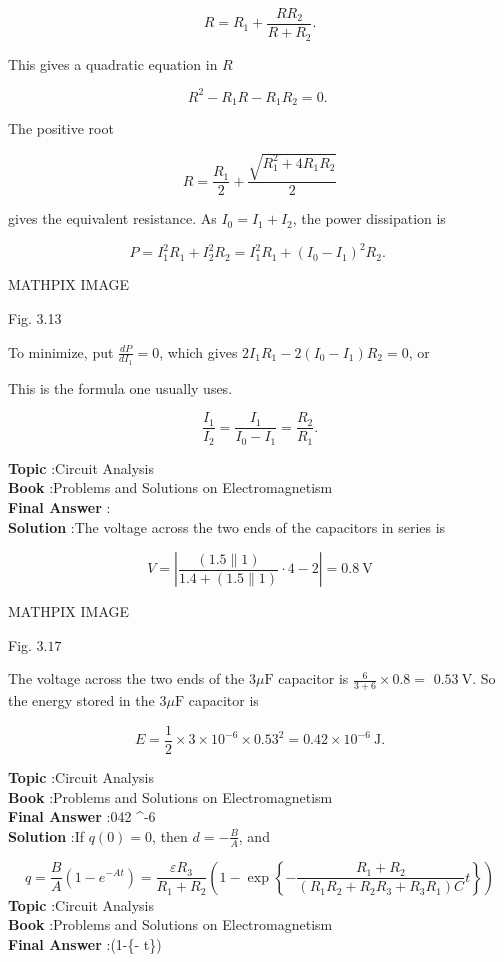 \documentclass[10pt]{article}
\begin{document}
$$
R=R_{1}+\frac{R R_{2}}{R+R_{2}} .
$$

This gives a quadratic equation in $R$

$$
R^{2}-R_{1} R-R_{1} R_{2}=0 \text {. }
$$

The positive root

$$
R=\frac{R_{1}}{2}+\frac{\sqrt{R_{1}^{2}+4 R_{1} R_{2}}}{2}
$$

gives the equivalent resistance.
 As $I_{0}=I_{1}+I_{2}$, the power dissipation is

$$
P=I_{1}^{2} R_{1}+I_{2}^{2} R_{2}=I_{1}^{2} R_{1}+\left(I_{0}-I_{1}\right)^{2} R_{2} \text {. }
$$

MATHPIX IMAGE

Fig. 3.13

To minimize, put $\frac{d P}{d I_{1}}=0$, which gives $2 I_{1} R_{1}-2\left(I_{0}-I_{1}\right) R_{2}=0$, or

This is the formula one usually uses.

$$
\frac{I_{1}}{I_{2}}=\frac{I_{1}}{I_{0}-I_{1}}=\frac{R_{2}}{R_{1}} .
$$

\textbf{Topic} :Circuit Analysis\\
\textbf{Book} :Problems and Solutions on Electromagnetism\\
\textbf{Final Answer} :\\


\textbf{Solution} :The voltage across the two ends of the capacitors in series is

$$
V=\left|\frac{(1.5 \| 1)}{1.4+(1.5 \| 1)} \cdot 4-2\right|=0.8 \mathrm{~V}
$$



MATHPIX IMAGE

Fig. $3.17$

The voltage across the two ends of the $3 \mu \mathrm{F}$ capacitor is $\frac{6}{3+6} \times 0.8=$ $0.53 \mathrm{~V}$. So the energy stored in the $3 \mu \mathrm{F}$ capacitor is

$$
E=\frac{1}{2} \times 3 \times 10^{-6} \times 0.53^{2}=0.42 \times 10^{-6} \mathrm{~J} .
$$

\textbf{Topic} :Circuit Analysis\\
\textbf{Book} :Problems and Solutions on Electromagnetism\\
\textbf{Final Answer} :042 ^{-6} \\


\textbf{Solution} :If $q(0)=0$, then $d=-\frac{B}{A}$, and

$$
q=\frac{B}{A}\left(1-e^{-A t}\right)=\frac{\varepsilon R_{3}}{R_{1}+R_{2}}\left(1-\exp \left\{-\frac{R_{1}+R_{2}}{\left(R_{1} R_{2}+R_{2} R_{3}+R_{3} R_{1}\right) C} t\right\}\right)
$$
\textbf{Topic} :Circuit Analysis\\
\textbf{Book} :Problems and Solutions on Electromagnetism\\
\textbf{Final Answer} :\left(1-\exp \left\{- t\right\}\right)\\
\end{document}
